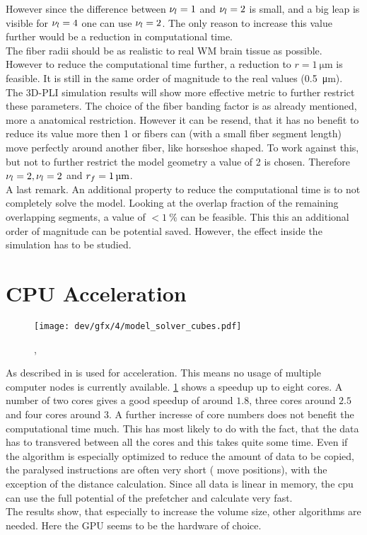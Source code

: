 However since the difference between $\textnormal{$\nu_{l}$}=\SI{1}{}$ and $\textnormal{$\nu_{l}$}=\SI{2}{}$ is small, and a big leap is visible for $\textnormal{$\nu_{l}$}=\SI{4}{}$ one can use $\textnormal{$\nu_{l}$}=\SI{2}{}$.
The only reason to increase this value further would be a reduction in computational time.
\\
% 
The fiber radii should be as realistic to real \acs{WM} brain tissue as possible.
However to reduce the computational time further, a reduction to $r = \SI{1}{\micro\meter}$ is feasible.
It is still in the same order of magnitude to the real values (\SI{0.5}{\micro\meter}).
The \ac{3D-PLI} simulation results will show more effective metric to further restrict these parameters.
% 
The choice of the fiber banding factor is as already mentioned, more a anatomical restriction.
However it can be resend, that it has no benefit to reduce its value more then 1 or fibers can (with a small fiber segment length) move perfectly around another fiber, like horseshoe shaped.
To work against this, but not to further restrict the model geometry a value of 2 is chosen.
Therefore $\textnormal{$\nu_{l}$} = \SI{2}{}, \textnormal{$\nu_{l}$}=\SI{2}{}$ and $\fiberRadius=\SI{1}{\micro\meter}$.
\\
% 
A last remark.
An additional property to reduce the computational time is to not completely solve the model. 
Looking at the overlap fraction of the remaining overlapping segments, a value of $<\SI{1}{\percent}$ can be feasible.
This this an additional order of magnitude can be potential saved.
However, the effect inside the simulation has to be studied.
% 
\section{CPU Acceleration}
% 
\begin{figure}[!t]
\centering
\texttt{[image: dev/gfx/4/model\_solver\_cubes.pdf]}
\caption[speedup]{, }
\label{fig:solverSpeedup}
\end{figure}
% 
As described in \dummy{} \openmp{} is used for acceleration.
This means no usage of multiple computer nodes is currently available.
\cref{fig:solverSpeedup} shows a speedup up to eight cores.
A number of two cores gives a good speedup of around $1.8$, three cores around $2.5$ and four cores around $3$.
A further incresse of core numbers does not benefit the computational time much.
This has most likely to do with the fact, that the data has to transvered between all the cores and this takes quite some time.
Even if the algorithm is especially optimized to reduce the amount of data to be copied, the paralysed instructions are often very short (\eg{} move positions), with the exception of the distance calculation.
Since all data is linear in memory, the cpu can use the full potential of the prefetcher and calculate very fast.
\\[\baselineskip]
% 
The results show, that especially to increase the volume size, other algorithms are needed. 
Here the \ac{GPU} seems to be the hardware of choice.
% 
